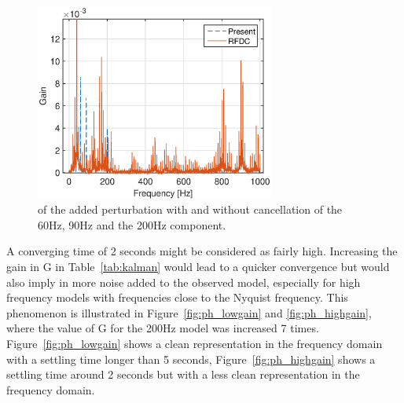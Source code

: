 \begin{figure}[h!]
  \centering
  \includegraphics[width=0.7\textwidth]{fig/matlab/3real_dist_fft.eps}
  \caption{\label{fig:fft_linear} \abbrFFT of the added perturbation with and without cancellation of the 60Hz, 90Hz and the 200Hz component.}
\end{figure}

A converging time of 2 seconds might be considered as fairly high. Increasing the gain in G in Table~\ref{tab:kalman} would lead to a quicker convergence but would also imply in more noise added to the observed model, especially for high frequency models with frequencies close to the Nyquist frequency. This phenomenon is illustrated in Figure~\ref{fig:ph_lowgain} and \ref{fig:ph_highgain}, where the value of G for the 200Hz model was increased 7 times. Figure~\ref{fig:ph_lowgain} shows a clean representation in the frequency domain with a settling time longer than 5 seconds, Figure~\ref{fig:ph_highgain} shows a settling time around 2 seconds but with a less clean representation in the frequency domain.

